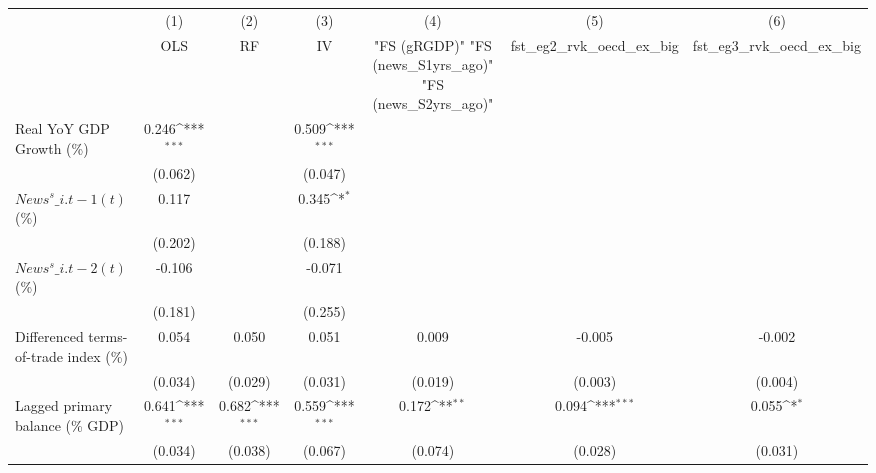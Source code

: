 {
\def\sym#1{\ifmmode^{#1}\else\(^{#1}\)\fi}
\begin{tabular}{l*{6}{c}}
\toprule
                    &\multicolumn{1}{c}{(1)}&\multicolumn{1}{c}{(2)}&\multicolumn{1}{c}{(3)}&\multicolumn{1}{c}{(4)}&\multicolumn{1}{c}{(5)}&\multicolumn{1}{c}{(6)}\\
                    &\multicolumn{1}{c}{OLS}&\multicolumn{1}{c}{RF}&\multicolumn{1}{c}{IV}&\multicolumn{1}{c}{ "FS (gRGDP)"  "FS (news\_S1yrs\_ago)"  "FS (news\_S2yrs\_ago)" }&\multicolumn{1}{c}{fst\_eg2\_rvk\_oecd\_ex\_big}&\multicolumn{1}{c}{fst\_eg3\_rvk\_oecd\_ex\_big}\\
\midrule
Real YoY GDP Growth (\%)&       0.246\sym{***}&                     &       0.509\sym{***}&                     &                     &                     \\
                    &     (0.062)         &                     &     (0.047)         &                     &                     &                     \\
\addlinespace
$ News^s\_{i.t-1}(t)$ (\%)&       0.117         &                     &       0.345\sym{*}  &                     &                     &                     \\
                    &     (0.202)         &                     &     (0.188)         &                     &                     &                     \\
\addlinespace
$ News^s\_{i.t-2}(t)$ (\%)&      -0.106         &                     &      -0.071         &                     &                     &                     \\
                    &     (0.181)         &                     &     (0.255)         &                     &                     &                     \\
\addlinespace
Differenced terms-of-trade index (\%)&       0.054         &       0.050         &       0.051         &       0.009         &      -0.005         &      -0.002         \\
                    &     (0.034)         &     (0.029)         &     (0.031)         &     (0.019)         &     (0.003)         &     (0.004)         \\
\addlinespace
Lagged primary balance (\% GDP)&       0.641\sym{***}&       0.682\sym{***}&       0.559\sym{***}&       0.172\sym{**} &       0.094\sym{***}&       0.055\sym{*}  \\
                    &     (0.034)         &     (0.038)         &     (0.067)         &     (0.074)         &     (0.028)         &     (0.031)         \\

\end{tabular}}
